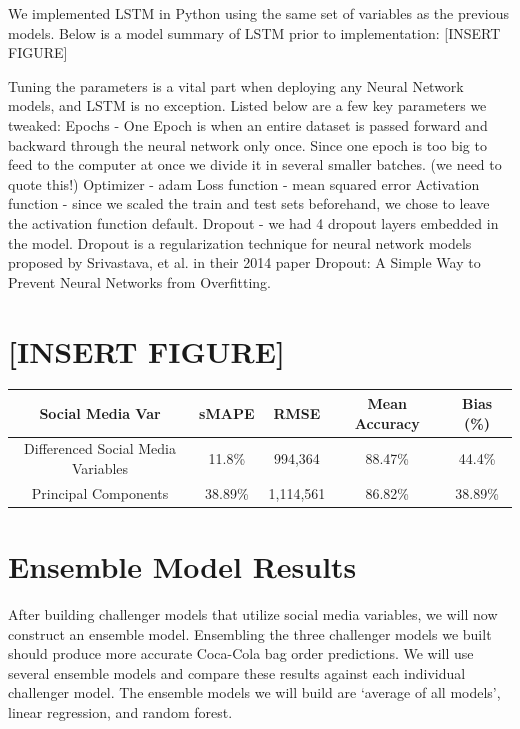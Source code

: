 \documentclass[12pt,oneside]{chicagocapstone}
\begin{document}
We implemented LSTM in Python using the same set of variables as the
previous models. Below is a model summary of LSTM prior to
implementation: {[}INSERT FIGURE{]}

Tuning the parameters is a vital part when deploying any Neural Network
models, and LSTM is no exception. Listed below are a few key parameters
we tweaked: Epochs - One Epoch is when an entire dataset is passed
forward and backward through the neural network only once. Since one
epoch is too big to feed to the computer at once we divide it in several
smaller batches. (we need to quote this!) Optimizer - adam Loss function
- mean squared error Activation function - since we scaled the train and
test sets beforehand, we chose to leave the activation function default.
Dropout - we had 4 dropout layers embedded in the model. Dropout is a
regularization technique for neural network models proposed by
Srivastava, et al. in their 2014 paper Dropout: A Simple Way to Prevent
Neural Networks from Overfitting.

\section{{[}INSERT FIGURE{]}}\label{insert-figure}
\begin{longtable}[]{@{}ccccc@{}}
\toprule
Social Media Var & sMAPE & RMSE & Mean Accuracy & Bias
(\%)\tabularnewline
\midrule
\endhead
Differenced Social Media Variables & 11.8\% & 994,364 & 88.47\% &
44.4\%\tabularnewline
Principal Components & 38.89\% & 1,114,561 & 86.82\% &
38.89\%\tabularnewline
\bottomrule
\end{longtable}
\section*{Ensemble Model Results}\label{ensemble-model-results}

After building challenger models that utilize social media variables, we
will now construct an ensemble model. Ensembling the three challenger
models we built should produce more accurate Coca-Cola bag order
predictions. We will use several ensemble models and compare these
results against each individual challenger model. The ensemble models we
will build are `average of all models', linear regression, and random
forest.
\end{document}
